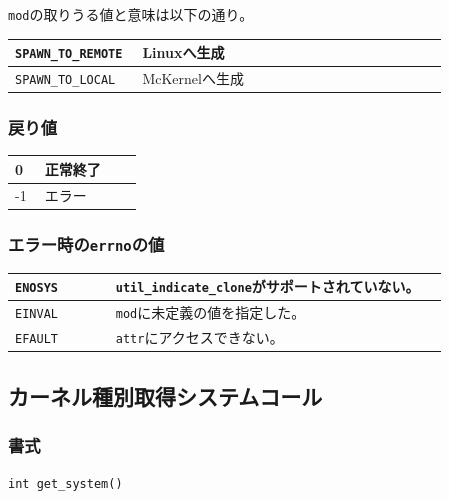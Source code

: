 \documentclass[twoside,11pt,fleqn]{book}
\begin{document}
\texttt{mod}の取りうる値と意味は以下の通り。
\begin{table}[!ht]
\footnotesize
\begin{tabular}{|p{0.20\linewidth}|p{0.66\linewidth}|} \hline
\texttt{SPAWN\_TO\_REMOTE}&Linuxへ生成\\ \hline
\texttt{SPAWN\_TO\_LOCAL}&McKernelへ生成\\ \hline
\end{tabular}
\vspace{-0em}
\end{table}
\FloatBarrier

\subsubsection*{戻り値}{\quad}
\begin{table}[!ht]
\footnotesize
\begin{tabular}{|p{0.20\linewidth}|p{0.66\linewidth}|} \hline
0&正常終了\\ \hline
-1&エラー\\ \hline
\end{tabular}
\vspace{-0em}
\end{table}
\FloatBarrier

\subsubsection*{エラー時の\texttt{errno}の値}{\quad}
\begin{table}[!ht]
\footnotesize
\begin{tabular}{|p{0.20\linewidth}|p{0.66\linewidth}|} \hline
\texttt{ENOSYS}& \texttt{util\_indicate\_clone}がサポートされていない。\\ \hline
\texttt{EINVAL}& \texttt{mod}に未定義の値を指定した。\\ \hline
\texttt{EFAULT}& \texttt{attr}にアクセスできない。\\ \hline
\end{tabular}
\vspace{-0em}
\end{table}
\FloatBarrier

\subsection{カーネル種別取得システムコール}
\subsubsection*{書式}{\quad} \texttt{int get\_system()}
\end{document}
